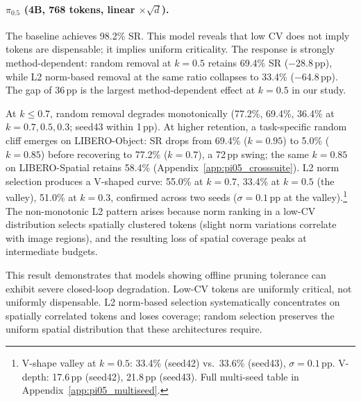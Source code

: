 \paragraph{$\pi_0.5$ (4B, 768 tokens, linear $\times\!\sqrt{d}$).} The baseline achieves 98.2\% SR. This model reveals that low CV does not imply tokens are dispensable; it implies uniform criticality. The response is strongly method-dependent: random removal at $k{=}0.5$ retains 69.4\% SR ($-$28.8\,pp), while L2 norm-based removal at the same ratio collapses to 33.4\% ($-$64.8\,pp). The gap of 36\,pp is the largest method-dependent effect at $k{=}0.5$ in our study.

At $k \leq 0.7$, random removal degrades monotonically (77.2\%, 69.4\%, 36.4\% at $k{=}0.7, 0.5, 0.3$; seed43 within 1\,pp). At higher retention, a task-specific random cliff emerges on LIBERO-Object: SR drops from 69.4\% ($k{=}0.95$) to 5.0\% ($k{=}0.85$) before recovering to 77.2\% ($k{=}0.7$), a 72\,pp swing; the same $k{=}0.85$ on LIBERO-Spatial retains 58.4\% (Appendix~\ref{app:pi05_crosssuite}). L2 norm selection produces a V-shaped curve: 55.0\% at $k{=}0.7$, 33.4\% at $k{=}0.5$ (the valley), 51.0\% at $k{=}0.3$, confirmed across two seeds ($\sigma = 0.1$\,pp at the valley).\footnote{V-shape valley at $k{=}0.5$: 33.4\% (seed42) vs.\ 33.6\% (seed43), $\sigma{=}0.1$\,pp. V-depth: 17.6\,pp (seed42), 21.8\,pp (seed43). Full multi-seed table in Appendix~\ref{app:pi05_multiseed}.} The non-monotonic L2 pattern arises because norm ranking in a low-CV distribution selects spatially clustered tokens (slight norm variations correlate with image regions), and the resulting loss of spatial coverage peaks at intermediate budgets.

This result demonstrates that models showing offline pruning tolerance can exhibit severe closed-loop degradation. Low-CV tokens are uniformly critical, not uniformly dispensable. L2 norm-based selection systematically concentrates on spatially correlated tokens and loses coverage; random selection preserves the uniform spatial distribution that these architectures require.

